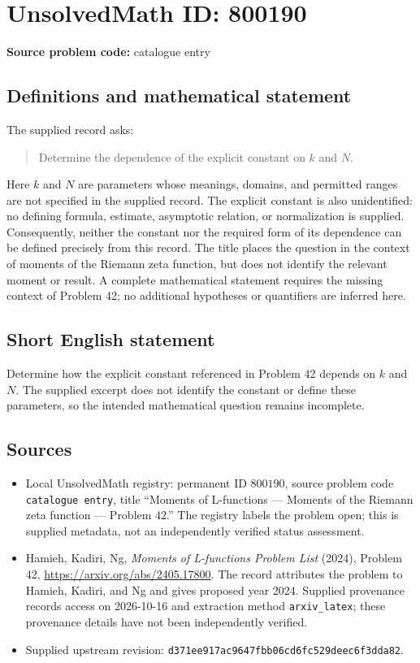 \documentclass[11pt]{article}
\begin{document}
\section*{UnsolvedMath ID: 800190}
\textbf{Source problem code:} catalogue entry
\subsection{Definitions and mathematical statement}
The supplied record asks:
\begin{quote}
Determine the dependence of the explicit constant on \(k\) and \(N\).
\end{quote}
Here \(k\) and \(N\) are parameters whose meanings, domains, and permitted ranges are not specified in the supplied record. The explicit constant is also unidentified: no defining formula, estimate, asymptotic relation, or normalization is supplied. Consequently, neither the constant nor the required form of its dependence can be defined precisely from this record. The title places the question in the context of moments of the Riemann zeta function, but does not identify the relevant moment or result. A complete mathematical statement requires the missing context of Problem 42; no additional hypotheses or quantifiers are inferred here.
\subsection{Short English statement}
Determine how the explicit constant referenced in Problem 42 depends on \(k\) and \(N\). The supplied excerpt does not identify the constant or define these parameters, so the intended mathematical question remains incomplete.
\subsection{Sources}
\begin{itemize}
\item Local UnsolvedMath registry: permanent ID \(800190\), source problem code \texttt{catalogue entry}, title ``Moments of L-functions --- Moments of the Riemann zeta function --- Problem 42.'' The registry labels the problem open; this is supplied metadata, not an independently verified status assessment.
\item Hamieh, Kadiri, Ng, \emph{Moments of L-functions Problem List} (2024), Problem 42, \url{https://arxiv.org/abs/2405.17800}. The record attributes the problem to Hamieh, Kadiri, and Ng and gives proposed year 2024. Supplied provenance records access on 2026-10-16 and extraction method \texttt{arxiv\_latex}; these provenance details have not been independently verified.
\item Supplied upstream revision: \texttt{d371ee917ac9647fbb06cd6fc529deec6f3dda82}.
\end{itemize}
\end{document}

